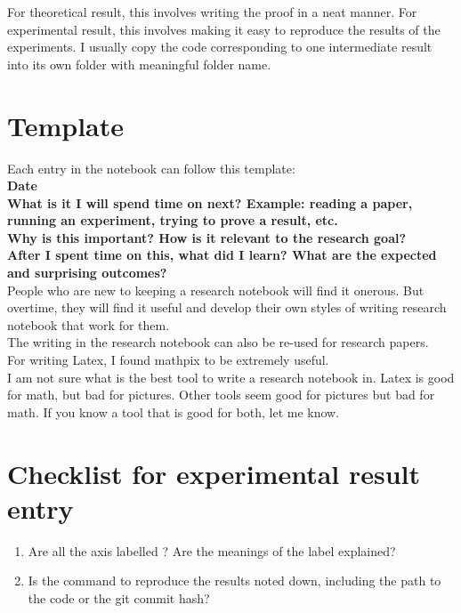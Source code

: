 \documentclass[11pt]{article}
\begin{document}
For theoretical result, this involves writing the proof in a neat manner. For experimental result, this involves making it easy to reproduce the results of the experiments. I usually copy the code corresponding to one intermediate result into its own folder with meaningful folder name.

\section{Template}

Each entry in the notebook can follow this template:
\\

\textbf{Date}
\\

\textbf{What is it I will spend time on next? Example: reading a paper, running an experiment, trying to prove a result, etc.}
\\

\textbf{Why is this important? How is it relevant to the research goal?}
\\

\textbf{After I spent time on this, what did I learn? What are the expected and surprising outcomes?}
\\

People who are new to keeping a research notebook will find it onerous. But overtime, they will find it useful and develop their own styles of writing research notebook that work for them.
\\

The writing in the research notebook can also be re-used for research papers.
\\

For writing Latex, I found mathpix to be extremely useful.
\\

I am not sure what is the best tool to write a research notebook in. Latex is good for math, but bad for pictures. Other tools seem good for pictures but bad for math. If you know a tool that is good for both, let me know.

\section{Checklist for experimental result entry}

\begin{enumerate}
	\item Are all the axis labelled ? Are the meanings of the label explained?
	\item Is the command to reproduce the results noted down, including the path to the code or the git commit hash?
\end{enumerate}
\end{document}
